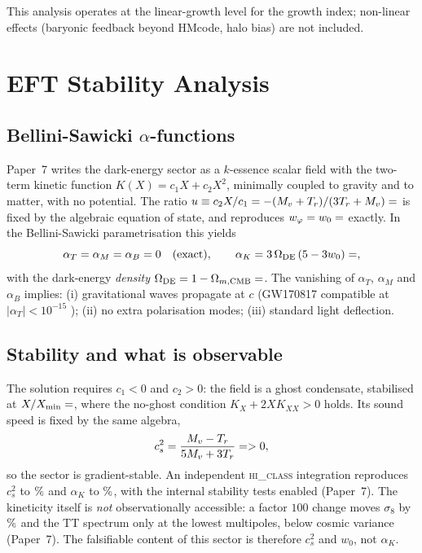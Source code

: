 \documentclass[12pt,a4paper]{article}
\newcommand{\OmmCMB}{\Omega_{m,\mathrm{CMB}}}
\newcommand{\wz}{w_0}
\newcommand{\alphaK}{\alpha_K}
\newcommand{\alphaB}{\alpha_B}
\newcommand{\alphaM}{\alpha_M}
\newcommand{\alphaT}{\alpha_T}
\begin{document}
This analysis operates at the linear-growth level for the growth index;
non-linear effects (baryonic feedback beyond HMcode, halo bias) are not
included.

\section{EFT Stability Analysis}
\label{sec:eft}

\subsection{Bellini-Sawicki $\alpha$-functions}
\label{sec:alphas}

Paper~7 \citep{AlmeidaSSEE2026P7} writes the dark-energy sector as a $k$-essence
scalar field with the two-term kinetic function $K(X)=c_1X+c_2X^2$, minimally
coupled to gravity and to matter, with no potential. The ratio
$u\equiv c_2X/c_1=-(M_v+T_r)/(3T_r+M_v)=\val{u_condensado_d6}$ is fixed by the algebraic
equation of state, and reproduces $w_\varphi=\wz=\val{W0_d6}$ exactly. In the
Bellini-Sawicki parametrisation \citep{Bellini2015} this yields
\begin{equation}
  \alphaT = \alphaM = \alphaB = 0 \quad (\text{exact}),
  \qquad
  \alphaK = 3\,\Omega_{\rm DE}\,(5-3\wz) = \val{alpha_K_z0_d6},
  \label{eq:alphas}
\end{equation}
with the dark-energy \emph{density} $\Omega_{\rm DE}=1-\OmmCMB=\val{OMDE_DENS_d6}$.
The vanishing of $\alphaT$, $\alphaM$ and $\alphaB$ implies: (i) gravitational
waves propagate at $c$ (GW170817 compatible at $|\alphaT| < 10^{-15}$
\citep{GW170817,Monitor2017}); (ii) no extra polarisation modes; (iii) standard
light deflection.

\subsection{Stability and what is observable}
\label{sec:eftcamb}

The solution requires $c_1<0$ and $c_2>0$: the field is a ghost condensate,
stabilised at $X/X_{\min}=\val{X_sobre_Xmin_d6}$, where the no-ghost condition
$K_X+2XK_{XX}>0$ holds. Its sound speed is fixed by the same algebra,
\begin{equation}
  c_s^2 = \frac{M_v-T_r}{5M_v+3T_r} = \val{cs2_condensado_d6} > 0,
  \label{eq:Qs}
\end{equation}
so the sector is gradient-stable. An independent \textsc{hi\_class}
integration reproduces $c_s^2$ to $\val{p7_hc_cs2_pct}\%$ and $\alphaK$ to $\val{p7_hc_alphaK_pct}\%$, with
the internal stability tests enabled (Paper~7). The kineticity itself is
\emph{not} observationally accessible: a factor $100$ change moves $\sigma_8$ by
$\val{p7_hc_s8_xk_pct}\%$ and the TT spectrum only at the lowest multipoles, below cosmic
variance (Paper~7). The falsifiable content of this sector is therefore $c_s^2$ and
$\wz$, not $\alphaK$.
\end{document}
